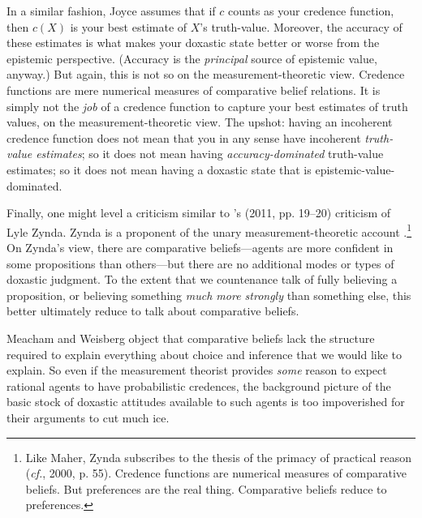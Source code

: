 In a similar fashion, Joyce assumes that if $c$ counts as your credence function, then $c(X)$ is your best estimate of $X$'s truth-value. Moreover, the accuracy of these estimates is what makes your doxastic state better or worse from the epistemic perspective. (Accuracy is the \textit{principal} source of epistemic value, anyway.) But again, this is not so on the measurement-theoretic view. Credence functions are mere numerical measures of comparative belief relations. It is simply not the \textit{job} of a credence function to capture your best estimates of truth values, on the measurement-theoretic view. The upshot: having an incoherent credence function does not mean that you in any sense have incoherent \textit{truth-value estimates}; so it does not mean having \textit{accuracy-dominated} truth-value estimates; so it does not mean having a doxastic state that is epistemic-value-dominated.

Finally, one might level a criticism similar to \citeauthor{Meacham2011}'s (2011, pp. 19--20) criticism of Lyle Zynda. Zynda is a proponent of the unary measurement-theoretic account \citep[pp. 66--68]{Zynda2000}.\footnote{Like Maher, Zynda subscribes to the thesis of the primacy of practical reason (\textit{cf.}, \citeauthor{Zynda2000} 2000, p. 55). Credence functions are numerical measures of comparative beliefs. But preferences are the real thing. Comparative beliefs reduce to preferences.} On Zynda's view, there are comparative beliefs---agents are more confident in some propositions than others---but there are no additional modes or types of doxastic judgment. To the extent that we countenance talk of fully believing a proposition, or believing something \textit{much more strongly} than something else, this better ultimately reduce to talk about comparative beliefs.

Meacham and Weisberg object that comparative beliefs lack the structure required to explain everything about choice and inference that we would like to explain. So even if the measurement theorist provides \textit{some} reason to expect rational agents to have probabilistic credences, the background picture of the basic stock of doxastic attitudes available to such agents is too impoverished for their arguments to cut much ice.

